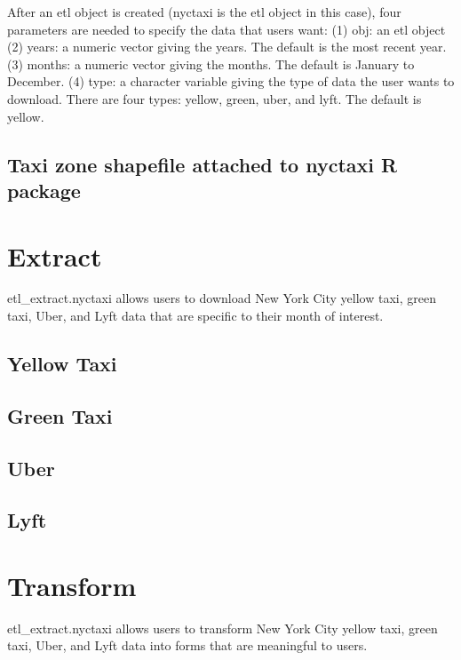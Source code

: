 \documentclass[12pt,twoside]{reedthesis}
\theoremstyle{definition}
\theoremstyle{definition}
\theoremstyle{definition}
\theoremstyle{remark}
\begin{document}
After an etl object is created (nyctaxi is the etl object in this case),
four parameters are needed to specify the data that users want: (1) obj:
an etl object (2) years: a numeric vector giving the years. The default
is the most recent year. (3) months: a numeric vector giving the months.
The default is January to December. (4) type: a character variable
giving the type of data the user wants to download. There are four
types: yellow, green, uber, and lyft. The default is yellow.

\subsection{Taxi zone shapefile attached to nyctaxi R
package}\label{taxi-zone-shapefile-attached-to-nyctaxi-r-package}

\section{Extract}\label{extract}

etl\_extract.nyctaxi allows users to download New York City yellow taxi,
green taxi, Uber, and Lyft data that are specific to their month of
interest.

\subsection{Yellow Taxi}\label{yellow-taxi-2}

\subsection{Green Taxi}\label{green-taxi-2}

\subsection{Uber}\label{uber-2}

\subsection{Lyft}\label{lyft-2}

\section{Transform}\label{transform}

etl\_extract.nyctaxi allows users to transform New York City yellow
taxi, green taxi, Uber, and Lyft data into forms that are meaningful to
users.
\end{document}
